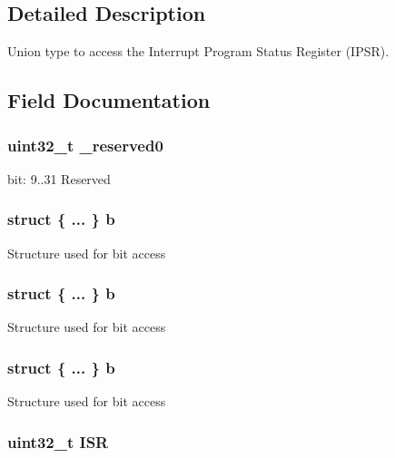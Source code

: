 \subsection{Detailed Description}
Union type to access the Interrupt Program Status Register (I\-P\-S\-R). 

\subsection{Field Documentation}
\hypertarget{union_i_p_s_r___type_ac8a6a13838a897c8d0b8bc991bbaf7c1}{
\subsubsection[{\-\_\-reserved0}]{\setlength{\rightskip}{0pt plus 5cm}uint32\-\_\-t \-\_\-reserved0}}\label{union_i_p_s_r___type_ac8a6a13838a897c8d0b8bc991bbaf7c1}
bit\-: 9..31 Reserved \hypertarget{union_i_p_s_r___type_a3758147356a15906221a5625a27d9048}{
\subsubsection[{b}]{\setlength{\rightskip}{0pt plus 5cm}struct \{ ... \}   b}}\label{union_i_p_s_r___type_a3758147356a15906221a5625a27d9048}
Structure used for bit access \hypertarget{union_i_p_s_r___type_ac4b1360265e95e8f834ee8f804b83f3a}{
\subsubsection[{b}]{\setlength{\rightskip}{0pt plus 5cm}struct \{ ... \}   b}}\label{union_i_p_s_r___type_ac4b1360265e95e8f834ee8f804b83f3a}
Structure used for bit access \hypertarget{union_i_p_s_r___type_ac424c5b49a721a7dbf69205402156fc9}{
\subsubsection[{b}]{\setlength{\rightskip}{0pt plus 5cm}struct \{ ... \}   b}}\label{union_i_p_s_r___type_ac424c5b49a721a7dbf69205402156fc9}
Structure used for bit access \hypertarget{union_i_p_s_r___type_ad502ba7dbb2aab5f87c782b28f02622d}{
\subsubsection[{I\-S\-R}]{\setlength{\rightskip}{0pt plus 5cm}uint32\-\_\-t I\-S\-R}}\label{union_i_p_s_r___type_ad502ba7dbb2aab5f87c782b28f02622d}
